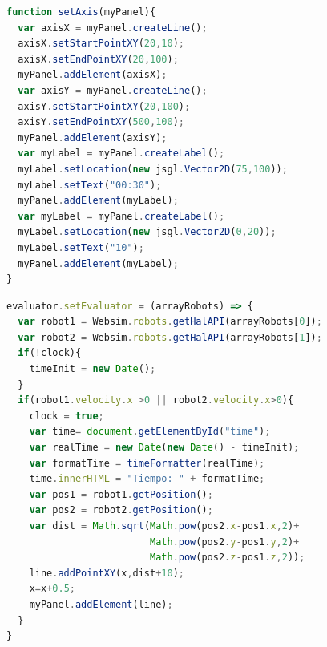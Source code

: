 \begin{lstlisting}[language=javascript,caption=Método \textit{createInterface}]
function setAxis(myPanel){
  var axisX = myPanel.createLine();
  axisX.setStartPointXY(20,10);
  axisX.setEndPointXY(20,100);
  myPanel.addElement(axisX);
  var axisY = myPanel.createLine();
  axisY.setStartPointXY(20,100);
  axisY.setEndPointXY(500,100);
  myPanel.addElement(axisY);
  var myLabel = myPanel.createLabel();
  myLabel.setLocation(new jsgl.Vector2D(75,100));
  myLabel.setText("00:30");
  myPanel.addElement(myLabel);
  var myLabel = myPanel.createLabel();
  myLabel.setLocation(new jsgl.Vector2D(0,20));
  myLabel.setText("10");
  myPanel.addElement(myLabel);
}
\end{lstlisting}

\begin{lstlisting}[language=javascript,caption={Código JavaScript que calcula la distancia entre \textit{drones}, la representa e incorpora un cronómetro al \textit{DOM}}]
evaluator.setEvaluator = (arrayRobots) => {
  var robot1 = Websim.robots.getHalAPI(arrayRobots[0]);
  var robot2 = Websim.robots.getHalAPI(arrayRobots[1]);
  if(!clock){
    timeInit = new Date();
  }
  if(robot1.velocity.x >0 || robot2.velocity.x>0){
    clock = true;
    var time= document.getElementById("time");
    var realTime = new Date(new Date() - timeInit);
    var formatTime = timeFormatter(realTime);
    time.innerHTML = "Tiempo: " + formatTime;
    var pos1 = robot1.getPosition();
    var pos2 = robot2.getPosition();
    var dist = Math.sqrt(Math.pow(pos2.x-pos1.x,2)+
                         Math.pow(pos2.y-pos1.y,2)+
                         Math.pow(pos2.z-pos1.z,2));
    line.addPointXY(x,dist+10);
    x=x+0.5;
    myPanel.addElement(line);
  }
}
\end{lstlisting}
